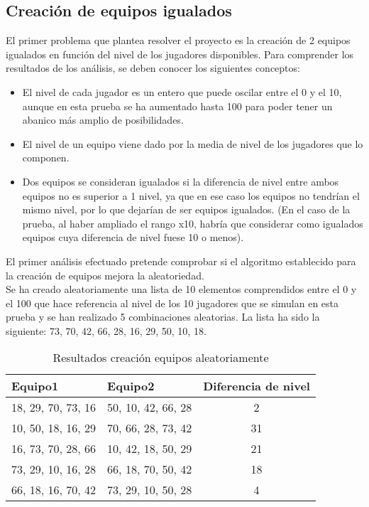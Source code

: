 \subsection{Creación de equipos igualados}

El primer problema que plantea resolver el proyecto es la creación de 2 equipos igualados en función del nivel de los jugadores disponibles.
Para comprender los resultados de los análisis, se deben conocer los siguientes conceptos:

\begin{itemize}
    \item El nivel de cada jugador es un entero que puede oscilar entre el 0 y el 10, aunque en esta prueba se ha aumentado hasta 100 para poder tener un abanico más amplio de posibilidades.
    \item El nivel de un equipo viene dado por la media de nivel de los jugadores que lo componen.
    \item Dos equipos se consideran igualados si la diferencia de nivel entre ambos equipos no es superior a 1 nivel, ya que en ese caso los equipos no tendrían el mismo nivel, por lo que dejarían de ser equipos igualados.
     (En el caso de la prueba, al haber ampliado el rango x10, habría que considerar como igualados equipos cuya diferencia de nivel fuese 10 o menos).
\end{itemize}

El primer análisis efectuado pretende comprobar si el algoritmo establecido para la creación de equipos mejora la aleatoriedad.\\

Se ha creado aleatoriamente una lista de 10 elementos comprendidos entre el 0 y el 100 que hace referencia al nivel de los 10 jugadores
que se simulan en esta prueba y se han realizado 5 combinaciones aleatorias. La lista ha sido la siguiente:  73, 70, 42, 66, 28, 16, 29, 50, 10, 18.\\

\begin{table}[h]
    \centering
    \begin{center}
        \begin{tabular}{| l | l | c |}
            \hline
            \textbf{Equipo1} & \textbf{Equipo2} & \textbf{Diferencia de nivel}\\
            \hline
            18, 29, 70, 73, 16 & 50, 10, 42, 66, 28 & 2\\
            \hline
            10, 50, 18, 16, 29 & 70, 66, 28, 73, 42 & 31\\
            \hline
            16, 73, 70, 28, 66 & 10, 42, 18, 50, 29 & 21\\
            \hline
            73, 29, 10, 16, 28 & 66, 18, 70, 50, 42 & 18\\
            \hline
            66, 18, 16, 70, 42 & 73, 29, 10, 50, 28 & 4\\
            \hline
        \end{tabular}
        \caption{Resultados creación equipos aleatoriamente}
    \end{center}
\end{table}


